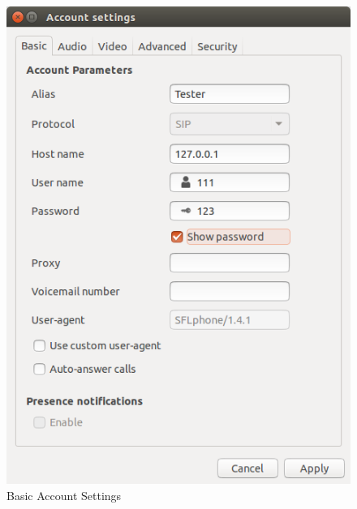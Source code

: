 \documentclass[a4paper,11pt]{report}
\begin{document}
\begin{figure}[h]
  \begin{center}
    \includegraphics[scale = 0.4]{SIP_basic_settings}
    \caption{Basic Account Settings}
  \end{center}
\end{figure}
\end{document}
